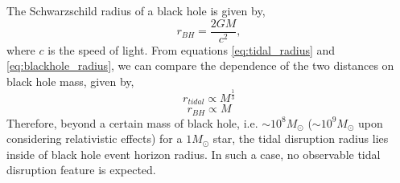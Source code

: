 \documentclass{tda}
\begin{document}
\noindent The Schwarzschild radius of a black hole is given by,
\begin{equation}
	r_{BH} = \frac{2GM}{c^2},
	\label{eq:blackhole_radius}
\end{equation}
where \(c\) is the speed of light. From equations \ref{eq:tidal_radius} and \ref{eq:blackhole_radius}, we can compare the dependence of the two distances on black hole mass, given by,
\begin{equation}
	r_{tidal} \propto M^\frac{1}{3}
	\label{eq:tidal_radius_proportionality}
\end{equation}
\begin{equation}
	r_{BH} \propto M
	\label{eq:blackhole_radius_proportionality}
\end{equation}
Therefore, beyond a certain mass of black hole, i.e. \(\sim10^8 M_{\odot}\) (\(\sim10^9 M_{\odot}\) upon considering relativistic effects) for a \(1 M_{\odot}\) star, the tidal disruption radius lies inside of black hole event horizon radius. In such a case, no observable tidal disruption feature is expected.
\end{document}
